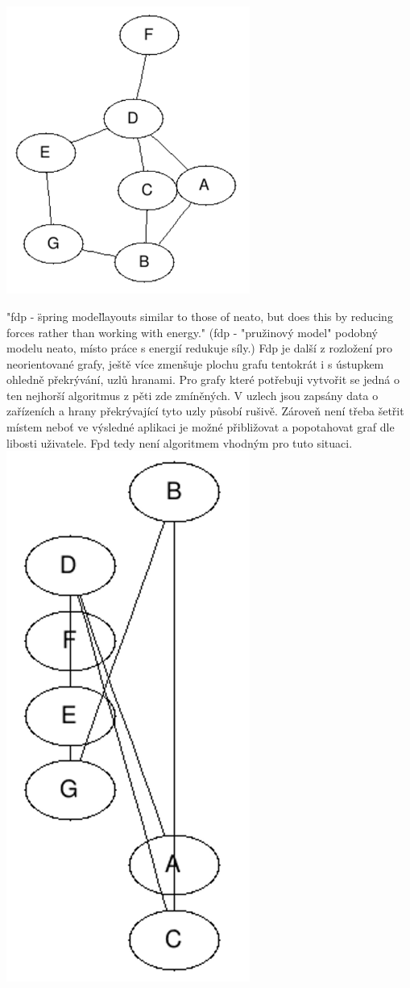 \documentclass[color,table,oneside,nolot,nolof]{fithesis}
\begin{document}
	\includegraphics[width=0.6\textwidth]{pictures/neato_example.png} 

	"fdp - \"spring model\" layouts similar to those of neato, but does this by reducing forces rather than working with energy."\cite{graphviz_layout} (fdp - "pružinový model" podobný
	modelu neato, místo práce s energií redukuje síly.) Fdp je další z rozložení pro neorientované grafy, ještě více zmenšuje plochu grafu tentokrát i s ústupkem ohledně překrývání,
	uzlů hranami. Pro grafy které potřebuji vytvořit se jedná o ten nejhorší algoritmus z pěti zde zmíněných. V uzlech jsou zapsány data o zařízeních a hrany překrývající tyto uzly
	působí rušivě. Zároveň není třeba šetřit místem neboť ve výsledné aplikaci je možné přibližovat a popotahovat graf dle libosti uživatele. Fpd tedy není algoritmem vhodným pro tuto
	situaci.
	\includegraphics[width=0.6\textwidth]{pictures/fdp_example.png} 
\end{document}

